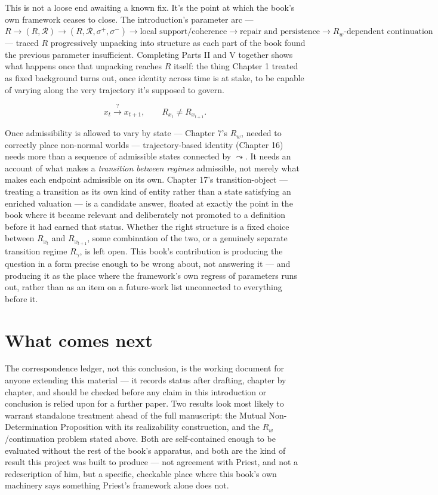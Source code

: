 This is not a loose end awaiting a known fix. It's the point at which the
book's own framework ceases to close. The introduction's parameter arc
--- \(R \to (R,\mathcal{R}) \to (R,\mathcal{R},\sigma^+,\sigma^-) \to \text{local support/coherence} \to \text{repair and persistence} \to R_w\text{-dependent continuation}\) --- traced \(R\) progressively unpacking
into structure as each part of the book found the previous parameter
insufficient. Completing Parts II and V together shows what happens once
that unpacking reaches \(R\) itself: the thing Chapter 1 treated as fixed
background turns out, once identity across time is at stake, to be
capable of varying along the very trajectory it's supposed to govern.

\[x_t \xrightarrow{?} x_{t+1}, \qquad R_{x_t} \neq R_{x_{t+1}}.\]

Once admissibility is allowed to vary by state --- Chapter 7's \(R_w\),
needed to correctly place non-normal worlds --- trajectory-based identity
(Chapter 16) needs more than a sequence of admissible states connected by
\(\leadsto\). It needs an account of what makes a \emph{transition between
regimes} admissible, not merely what makes each endpoint admissible on
its own. Chapter 17's transition-object --- treating a transition as its
own kind of entity rather than a state satisfying an enriched valuation
--- is a candidate answer, floated at exactly the point in the book where
it became relevant and deliberately not promoted to a definition before
it had earned that status. Whether the right structure is a fixed choice
between \(R_{x_t}\) and \(R_{x_{t+1}}\), some combination of the two, or a
genuinely separate transition regime \(R_\gamma\), is left open. This
book's contribution is producing the question in a form precise enough
to be wrong about, not answering it --- and producing it as the place
where the framework's own regress of parameters runs out, rather than as
an item on a future-work list unconnected to everything before it.

\hypertarget{what-comes-next}{%
\section{What comes next}\label{what-comes-next}}

The correspondence ledger, not this conclusion, is the working document
for anyone extending this material --- it records status after drafting,
chapter by chapter, and should be checked before any claim in this
introduction or conclusion is relied upon for a further paper. Two
results look most likely to warrant standalone treatment ahead of the
full manuscript: the Mutual Non-Determination Proposition with its
realizability construction, and the \(R_w\)/continuation problem stated
above. Both are self-contained enough to be evaluated without the rest
of the book's apparatus, and both are the kind of result this project
was built to produce --- not agreement with Priest, and not a
redescription of him, but a specific, checkable place where this book's
own machinery says something Priest's framework alone does not.
